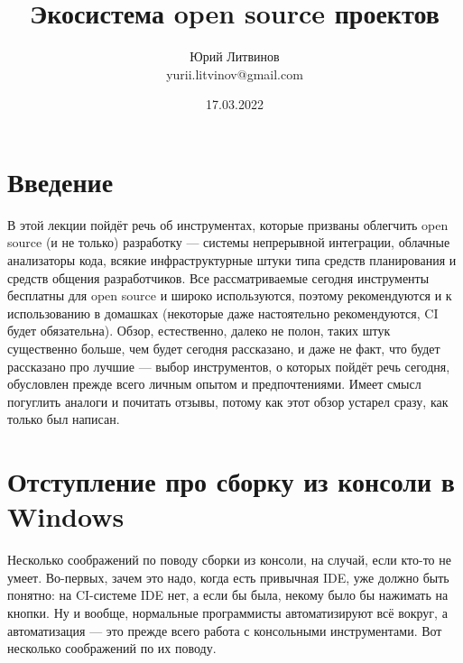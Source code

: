 \documentclass[a5paper]{article}
\title{Экосистема open source проектов}
\author{Юрий Литвинов\\\small{yurii.litvinov@gmail.com}}
\date{17.03.2022}
\begin{document}
\maketitle
\thispagestyle{empty}

\section{Введение}

В этой лекции пойдёт речь об инструментах, которые призваны облегчить open source (и не только) разработку --- системы непрерывной интеграции, облачные анализаторы кода, всякие инфраструктурные штуки типа средств планирования и средств общения разработчиков. Все рассматриваемые сегодня инструменты бесплатны для open source и широко используются, поэтому рекомендуются и к использованию в домашках (некоторые даже настоятельно рекомендуются, CI будет обязательна). Обзор, естественно, далеко не полон, таких штук существенно больше, чем будет сегодня рассказано, и даже не факт, что будет рассказано про лучшие --- выбор инструментов, о которых пойдёт речь сегодня, обусловлен прежде всего личным опытом и предпочтениями. Имеет смысл погуглить аналоги и почитать отзывы, потому как этот обзор устарел сразу, как только был написан.

\section{Отступление про сборку из консоли в Windows}

Несколько соображений по поводу сборки из консоли, на случай, если кто-то не умеет. Во-первых, зачем это надо, когда есть привычная IDE, уже должно быть понятно: на CI-системе IDE нет, а если бы была, некому было бы нажимать на кнопки. Ну и вообще, нормальные программисты автоматизируют всё вокруг, а автоматизация --- это прежде всего работа с консольными инструментами. Вот несколько соображений по их поводу.
\end{document}
